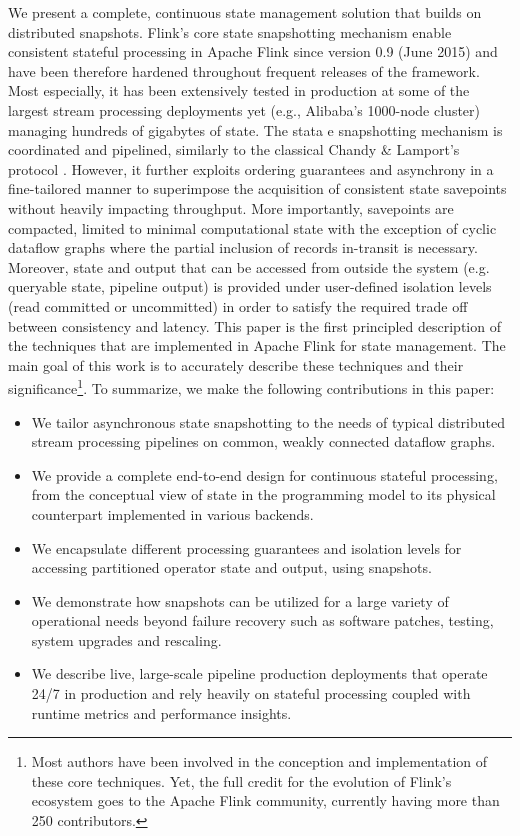 We present a complete, continuous state management solution that builds on distributed snapshots. Flink's core state snapshotting mechanism enable consistent stateful processing in Apache Flink since version 0.9 (June 2015) and have been therefore hardened throughout frequent releases of the framework. Most especially, it has been extensively tested in production at some of the largest stream processing deployments yet (e.g., Alibaba's 1000-node cluster) managing hundreds of gigabytes of state. The stata e snapshotting mechanism is coordinated and pipelined, similarly to the classical Chandy \& Lamport's protocol \cite{chandy1985distributed}. However, it further exploits ordering guarantees and asynchrony in a fine-tailored manner to superimpose the acquisition of consistent state savepoints without heavily impacting throughput. More importantly, savepoints are compacted, limited to minimal computational state with the exception of cyclic dataflow graphs where the partial inclusion of records in-transit is necessary. 
Moreover, state and output that can be accessed from outside the system (e.g. queryable state, pipeline output) is provided under user-defined isolation levels (read committed or uncommitted) in order to satisfy the required trade off between consistency and latency. 
This paper is the first principled description of the techniques that are implemented in Apache Flink for state management. The main goal of this work is to accurately describe these techniques and their significance\footnote{Most authors have been involved in the conception and implementation of these core techniques. Yet, the full credit for the evolution of Flink's ecosystem goes to the Apache Flink community, currently having more than 250 contributors.}. To summarize, we make the following contributions in this paper:

\begin{itemize}
	\item We tailor asynchronous state snapshotting to the needs of typical distributed stream processing pipelines on common, weakly connected dataflow graphs.
	\item We provide a complete end-to-end design for continuous stateful processing, from the conceptual view of state in the programming model to its physical counterpart implemented in various backends.
	\item We encapsulate different processing guarantees and isolation levels for accessing partitioned operator state and output, using snapshots.
	\item We demonstrate how snapshots can be utilized for a large variety of operational needs beyond failure recovery such as software patches, testing, system upgrades and rescaling.
	\item We describe live, large-scale pipeline production deployments that operate 24/7 in production and rely heavily on stateful processing coupled with runtime metrics and performance insights.
\end{itemize}

